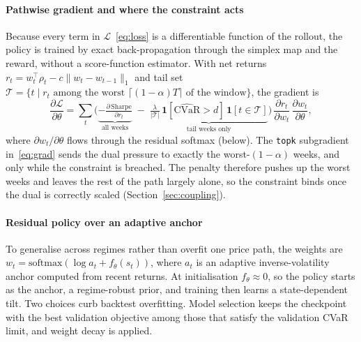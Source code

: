 \documentclass[sigconf]{acmart}
\begin{document}
\paragraph{Pathwise gradient and where the constraint acts} Because every term in
$\mathcal{L}$~\eqref{eq:loss} is a differentiable function of the rollout, the policy is trained
by exact back-propagation through the simplex map and the reward, without a
score-function estimator. With net returns $r_t = w_t^{\top}\rho_t - c\lVert w_t-w_{t-1}\rVert_1$
and tail set $\mathcal{T}=\{t \mid r_t \text{ among the worst } \lceil(1-\alpha)T\rceil
\text{ of the window}\}$, the gradient is
\begin{equation}\label{eq:grad}
\frac{\partial \mathcal{L}}{\partial \theta}
= \sum_{t}\Big(
  \underbrace{-\tfrac{\partial\,\mathrm{Sharpe}}{\partial r_t}}_{\text{all weeks}}
  \;-\;
  \underbrace{\tfrac{\lambda}{|\mathcal{T}|}\,
  \mathbf{1}[\widehat{\mathrm{CVaR}}>d]\,\mathbf{1}[t\in\mathcal{T}]}_{\text{tail weeks only}}
  \Big)\,\frac{\partial r_t}{\partial w_t}\,\frac{\partial w_t}{\partial \theta},
\end{equation}
where $\partial w_t/\partial\theta$ flows through the residual softmax
(below). The \texttt{topk} subgradient in~\eqref{eq:grad} sends the dual pressure to exactly the
worst-$(1-\alpha)$ weeks, and only while the constraint is breached. The penalty therefore
pushes up the worst weeks and leaves the rest of the path largely alone, so the constraint binds once the dual is correctly scaled (Section~\ref{sec:coupling}).

\paragraph{Residual policy over an adaptive anchor} To generalise across regimes
rather than overfit one price path, the weights are $w_t = \mathrm{softmax}(\log a_t +
f_\theta(s_t))$, where $a_t$ is an adaptive inverse-volatility anchor computed from
recent returns. At initialisation $f_\theta \approx 0$, so the policy starts as the anchor, a regime-robust prior, and training then learns a state-dependent tilt. Two choices curb backtest overfitting. Model selection keeps the checkpoint with the best validation
objective among those that satisfy the validation CVaR limit, and weight decay is applied.
\end{document}

